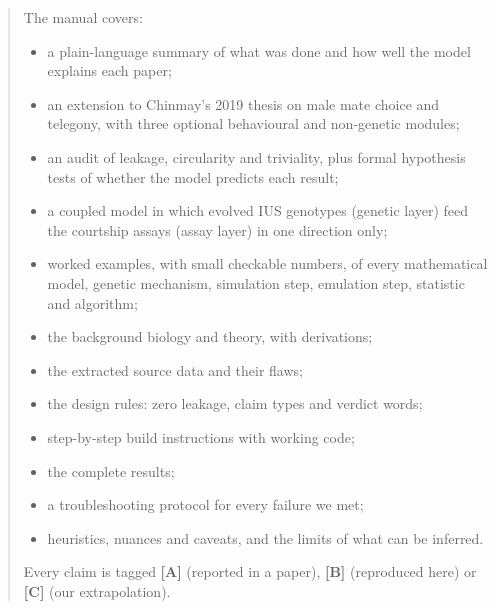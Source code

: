 \documentclass[11pt,a4paper]{report}
\newcommand{\claimA}{\textbf{[A]}}
\newcommand{\claimB}{\textbf{[B]}}
\newcommand{\claimC}{\textbf{[C]}}
\begin{document}
\begin{abstract}
\noindent The manual covers:
\begin{itemize}
\item a plain-language summary of what was done and how well the model explains each paper;
\item an extension to Chinmay's 2019 thesis on male mate choice and telegony, with three optional behavioural and non-genetic modules;
\item an audit of leakage, circularity and triviality, plus formal hypothesis tests of whether the model predicts each result;
\item a coupled model in which evolved IUS genotypes (genetic layer) feed the courtship assays (assay layer) in one direction only;
\item worked examples, with small checkable numbers, of every mathematical model, genetic mechanism, simulation step, emulation step, statistic and algorithm;
\item the background biology and theory, with derivations;
\item the extracted source data and their flaws;
\item the design rules: zero leakage, claim types and verdict words;
\item step-by-step build instructions with working code;
\item the complete results;
\item a troubleshooting protocol for every failure we met;
\item heuristics, nuances and caveats, and the limits of what can be inferred.
\end{itemize}
Every claim is tagged \claimA{} (reported in a paper), \claimB{} (reproduced here) or \claimC{} (our extrapolation).
\end{abstract}

\tableofcontents















\appendix


\end{document}
